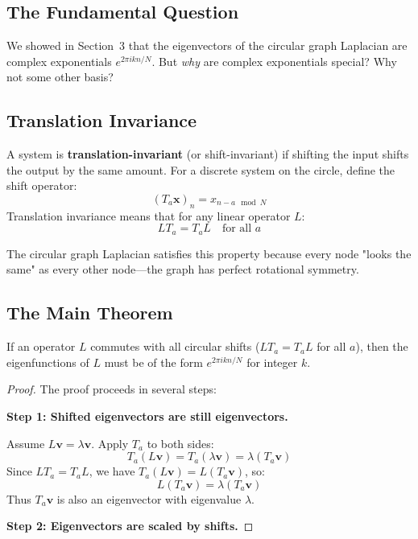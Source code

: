 \begin{notechapter}
\subsection{The Fundamental Question}

We showed in Section~3 that the eigenvectors of the circular graph 
Laplacian are complex exponentials $e^{2\pi i kn/N}$. But \emph{why} 
are complex exponentials special? Why not some other basis?

\subsection{Translation Invariance}

A system is \textbf{translation-invariant} (or shift-invariant) if 
shifting the input shifts the output by the same amount. For a discrete 
system on the circle, define the shift operator:
\[
(T_a \mathbf{x})_n = x_{n-a \mod N}
\]
Translation invariance means that for any linear operator $L$:
\[
L T_a = T_a L \quad \text{for all } a
\]

The circular graph Laplacian satisfies this property because every node 
"looks the same" as every other node---the graph has perfect rotational 
symmetry.

\subsection{The Main Theorem}

\begin{theorem}
\label{dft-to-gnn:thm:app-forced-eigenfunctions}
If an operator $L$ commutes with all circular shifts 
($L T_a = T_a L$ for all $a$), then the eigenfunctions of $L$ must be 
of the form $e^{2\pi i kn/N}$ for integer $k$.
\end{theorem}

\begin{proof}
The proof proceeds in several steps:

\textbf{Step 1: Shifted eigenvectors are still eigenvectors.}

Assume $L\mathbf{v} = \lambda \mathbf{v}$. Apply $T_a$ to both sides:
\[
T_a(L\mathbf{v}) = T_a(\lambda \mathbf{v}) = \lambda (T_a \mathbf{v})
\]
Since $LT_a = T_a L$, we have $T_a(L\mathbf{v}) = L(T_a \mathbf{v})$, so:
\[
L(T_a \mathbf{v}) = \lambda (T_a \mathbf{v})
\]
Thus $T_a \mathbf{v}$ is also an eigenvector with eigenvalue $\lambda$.

\textbf{Step 2: Eigenvectors are scaled by shifts.}


\end{proof}
\end{notechapter}
